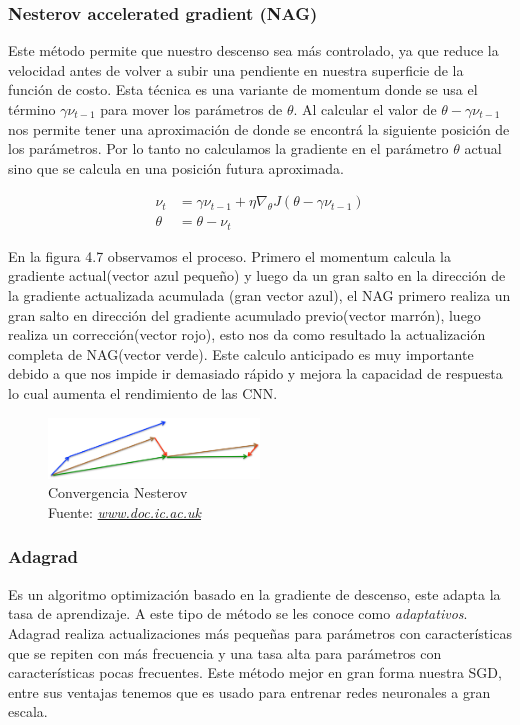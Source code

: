 \subsubsection{Nesterov accelerated gradient (NAG)}
Este método permite que nuestro descenso sea más controlado, ya que reduce la velocidad antes de volver a subir una pendiente en nuestra superficie de la función de costo. Esta técnica es una variante de momentum donde se usa el término $\gamma \nu_{t-1}$ para mover los parámetros de $\theta$. Al calcular el valor de $\theta - \gamma \nu_{t-1}$ nos permite tener una aproximación de donde se encontrá la siguiente posición de los parámetros. Por lo tanto no calculamos la gradiente en el parámetro $\theta$ actual sino que se calcula en una posición futura aproximada.




\begin{equation}
\label{mbgds}
\begin{aligned}
\nu_{t}&=\gamma \nu_{t-1} + \eta \nabla_{\theta} J(\theta- \gamma \nu_{t-1})\\
\theta &= \theta -\nu_{t}
\end{aligned}
\end{equation}

En la figura 4.7 observamos el proceso. Primero el momentum calcula la gradiente actual(vector azul pequeño)  y luego da un gran salto en la dirección de la gradiente actualizada acumulada (gran vector azul), el NAG primero realiza un gran salto en dirección del gradiente acumulado previo(vector marrón), luego realiza un corrección(vector rojo), esto nos da como resultado la actualización completa de NAG(vector verde). Este calculo anticipado es muy importante debido a que nos impide ir demasiado rápido y mejora la capacidad de respuesta lo cual aumenta el rendimiento de las CNN.
\begin{figure}[H]
	\centering
	\includegraphics[width=0.5\textwidth]{Figures/nesterov.png}
	\caption{Convergencia Nesterov\\ Fuente:  \href{https://www.doc.ic.ac.uk/~js4416/163/website/neural-networks/optimisers.html}{\textit{www.doc.ic.ac.uk}}}
	\label{nesterov }
\end{figure}
\subsubsection{Adagrad}
Es un algoritmo optimización basado en la gradiente de descenso, este adapta la tasa de aprendizaje. A este tipo de método se les conoce como \textit{adaptativos}. Adagrad realiza actualizaciones más pequeñas para parámetros con características que se repiten con más frecuencia y una tasa alta  para parámetros con características pocas frecuentes. Este método mejor en gran forma nuestra SGD, entre sus ventajas tenemos que es usado para entrenar redes neuronales a gran escala.


